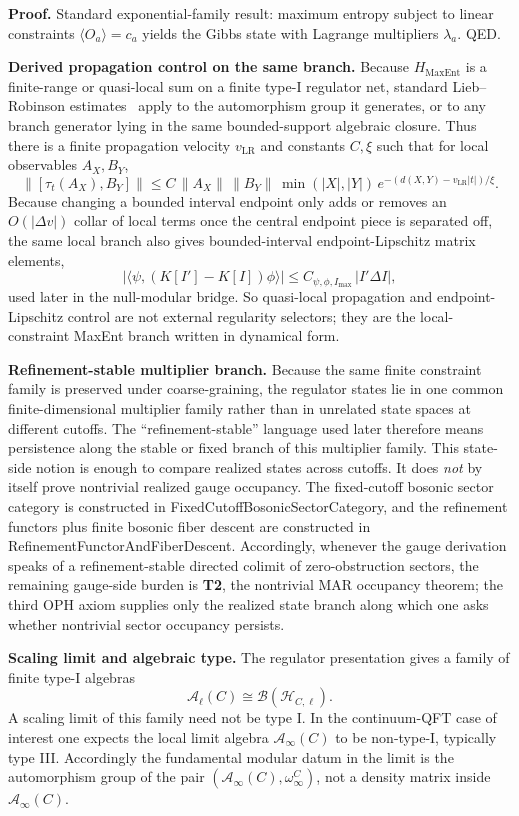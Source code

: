\textbf{Proof.} Standard exponential-family result: maximum entropy subject to linear constraints \(\langle O_a\rangle=c_a\) yields the Gibbs state with Lagrange multipliers \(\lambda_a\). QED.

\textbf{Derived propagation control on the same branch.} Because \(H_{\mathrm{MaxEnt}}\) is a finite-range or quasi-local sum on a finite type-I regulator net, standard Lieb--Robinson estimates~\cite{liebRobinson72} apply to the automorphism group it generates, or to any branch generator lying in the same bounded-support algebraic closure. Thus there is a finite propagation velocity \(v_{\mathrm{LR}}\) and constants \(C,\xi\) such that for local observables \(A_X,B_Y\),
\[
\bigl\|[\tau_t(A_X),B_Y]\bigr\|
\le
C\,\|A_X\|\,\|B_Y\|\,\min(|X|,|Y|)\,
e^{-(d(X,Y)-v_{\mathrm{LR}}|t|)/\xi}.
\]
Because changing a bounded interval endpoint only adds or removes an \(O(|\Delta v|)\) collar of local terms once the central endpoint piece is separated off, the same local branch also gives bounded-interval endpoint-Lipschitz matrix elements,
\[
\left|\langle\psi,(K[I']-K[I])\phi\rangle\right|
\le
C_{\psi,\phi,I_{\max}}\,|I'\Delta I|,
\]
used later in the null-modular bridge. So quasi-local propagation and endpoint-Lipschitz control are not external regularity selectors; they are the local-constraint MaxEnt branch written in dynamical form.

\textbf{Refinement-stable multiplier branch.} Because the same finite constraint family is preserved under coarse-graining, the regulator states lie in one common finite-dimensional multiplier family rather than in unrelated state spaces at different cutoffs. The ``refinement-stable'' language used later therefore means persistence along the stable or fixed branch of this multiplier family. This state-side notion is enough to compare realized states across cutoffs. It does \emph{not} by itself prove nontrivial realized gauge occupancy. The fixed-cutoff bosonic sector category is constructed in FixedCutoffBosonicSectorCategory, and the refinement functors plus finite bosonic fiber descent are constructed in RefinementFunctorAndFiberDescent. Accordingly, whenever the gauge derivation speaks of a refinement-stable directed colimit of zero-obstruction sectors, the remaining gauge-side burden is \textbf{T2}, the nontrivial MAR occupancy theorem; the third OPH axiom supplies only the realized state branch along which one asks whether nontrivial sector occupancy persists.

\textbf{Scaling limit and algebraic type.} The regulator presentation gives a family of finite type-I algebras
\[
\mathcal A_{\ell}(C)\cong \mathcal B(\mathcal H_{C,\ell}).
\]
A scaling limit of this family need not be type I. In the continuum-QFT case of interest one expects the local limit algebra \(\mathcal A_\infty(C)\) to be non-type-I, typically type III. Accordingly the fundamental modular datum in the limit is the automorphism group of the pair \((\mathcal A_\infty(C),\omega_\infty^C)\), not a density matrix inside \(\mathcal A_\infty(C)\).

